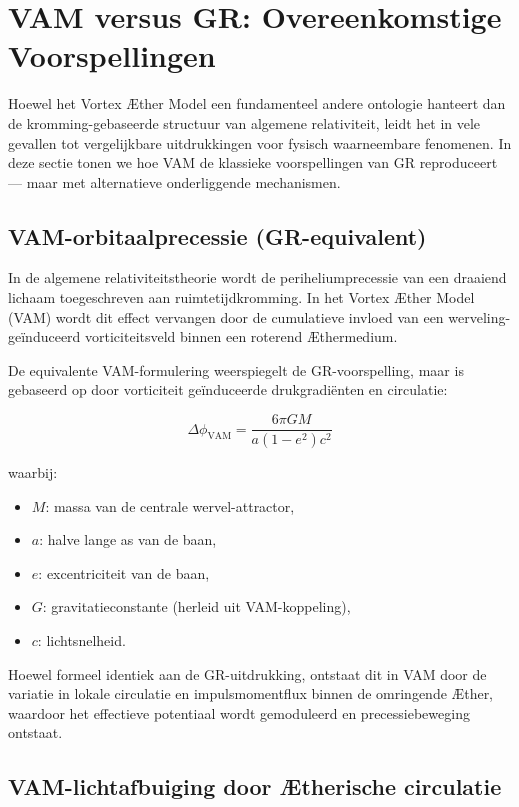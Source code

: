 \section{VAM versus GR: Overeenkomstige Voorspellingen}
\label{sec:vam-versus-gr-overeenkomstige-voorspellingen}

Hoewel het Vortex Æther Model een fundamenteel andere ontologie hanteert dan de kromming-gebaseerde structuur van algemene relativiteit, leidt het in vele gevallen tot vergelijkbare uitdrukkingen voor fysisch waarneembare fenomenen. In deze sectie tonen we hoe VAM de klassieke voorspellingen van GR reproduceert — maar met alternatieve onderliggende mechanismen.


\subsection*{VAM-orbitaalprecessie (GR-equivalent)}


In de algemene relativiteitstheorie wordt de periheliumprecessie van een draaiend lichaam toegeschreven aan ruimtetijdkromming. In het Vortex Æther Model (VAM) wordt dit effect vervangen door de cumulatieve invloed van een werveling-geïnduceerd vorticiteitsveld binnen een roterend Æthermedium.

De equivalente VAM-formulering weerspiegelt de GR-voorspelling, maar is gebaseerd op door vorticiteit geïnduceerde drukgradiënten en circulatie:

\begin{equation}
    \Delta\phi_\text{VAM} =
    \frac{6\pi G M}{a(1 - e^2) c^2}
\end{equation}

waarbij:
\begin{itemize}
    \item \( M \): massa van de centrale wervel-attractor,
    \item \( a \): halve lange as van de baan,
    \item \( e \): excentriciteit van de baan,
    \item \( G \): gravitatieconstante (herleid uit VAM-koppeling),
    \item \( c \): lichtsnelheid.
\end{itemize}
Hoewel formeel identiek aan de GR-uitdrukking, ontstaat dit in VAM door de variatie in lokale circulatie en impulsmomentflux binnen de omringende Æther, waardoor het effectieve potentiaal wordt gemoduleerd en precessiebeweging ontstaat.

\subsection*{VAM-lichtafbuiging door Ætherische circulatie}


